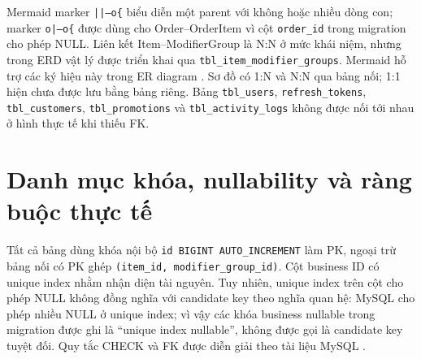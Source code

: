 \documentclass[12pt,a4paper,oneside]{report}
\begin{document}
Mermaid marker \texttt{||--o\{} biểu diễn một parent với không hoặc nhiều dòng con; marker \texttt{o|--o\{} được dùng cho Order–OrderItem vì cột \texttt{order\_id} trong migration cho phép NULL. Liên kết Item–ModifierGroup là N:N ở mức khái niệm, nhưng trong ERD vật lý được triển khai qua \texttt{tbl\_item\_modifier\_groups}. Mermaid hỗ trợ các ký hiệu này trong ER diagram \cite{mermaider}. Sơ đồ có 1:N và N:N qua bảng nối; 1:1 hiện chưa được lưu bằng bảng riêng. Bảng \texttt{tbl\_users}, \texttt{refresh\_tokens}, \texttt{tbl\_customers}, \texttt{tbl\_promotions} và \texttt{tbl\_activity\_logs} không được nối tới nhau ở hình thực tế khi thiếu FK.

\section{Danh mục khóa, nullability và ràng buộc thực tế}
Tất cả bảng dùng khóa nội bộ \texttt{id BIGINT AUTO\_\allowbreak INCREMENT} làm PK, ngoại trừ bảng nối có PK ghép \texttt{(item\_\allowbreak id, modifier\_\allowbreak group\_\allowbreak id)}. Cột business ID có unique index nhằm nhận diện tài nguyên. Tuy nhiên, unique index trên cột cho phép NULL không đồng nghĩa với candidate key theo nghĩa quan hệ: MySQL cho phép nhiều NULL ở unique index; vì vậy các khóa business nullable trong migration được ghi là “unique index nullable”, không được gọi là candidate key tuyệt đối. Quy tắc CHECK và FK được diễn giải theo tài liệu MySQL \cite{mysqlfk,mysqlcheck}.
\end{document}
